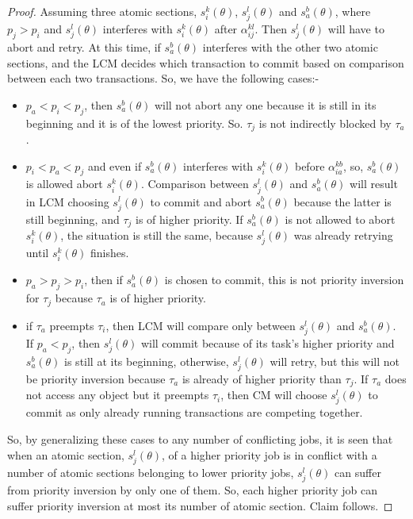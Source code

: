 \documentclass[12pt,english]{report}
\newtheorem{proof}{Proof}
\begin{document}
\begin{proof}\normalfont
Assuming three atomic sections, $s_i^k(\theta)$, $s_j^l(\theta)$ and $s_a^b(\theta)$, where $p_j > p_i$ and $s_j^l(\theta)$ interferes with $s_i^k(\theta)$ after $\alpha_{ij}^{kl}$. Then $s_j^l(\theta)$ will have to abort and retry. At this time, if $s_a^b(\theta)$ interferes with the other two atomic sections, and the LCM decides which transaction to commit based on comparison between each two transactions. So, we have the following cases:-
\begin{itemize}
\item $p_a < p_i < p_j$, then $s_a^b(\theta)$ will not abort any one because it is still in its beginning and it is of the lowest priority. So. $\tau_j$ is not indirectly blocked by $\tau_a$.
\item $p_i<p_a<p_j$ and even if $s_a^b(\theta)$ interferes with $s_i^k(\theta)$ before $\alpha_{ia}^{kb}$, so, $s_a^b(\theta)$ is allowed abort $s_i^k(\theta)$. Comparison between $s_j^l(\theta)$ and $s_a^b(\theta)$ will result in LCM choosing $s_j^l(\theta)$ to commit and abort $s_a^b(\theta)$ because the latter is still beginning, and $\tau_j$ is of higher priority. If $s_a^b(\theta)$ is not allowed to abort $s_i^k(\theta)$, the situation is still the same, because $s_j^l(\theta)$ was already retrying until $s_i^k(\theta)$ finishes.
\item $p_a>p_j>p_i$, then if $s_a^b(\theta)$ is chosen to commit, this is not priority inversion for $\tau_j$ because $\tau_a$ is of higher priority.
\item if $\tau_a$ preempts $\tau_i$, then LCM will compare only between $s_j^l(\theta)$ and $s_a^b(\theta)$. If $p_a<p_j$, then $s_j^l(\theta)$ will commit because of its task's higher priority and $s_a^b(\theta)$ is still at its beginning, otherwise, $s_j^l(\theta)$ will retry, but this will not be priority inversion because $\tau_a$ is already of higher priority than $\tau_j$. If $\tau_a$ does not access any object but it preempts $\tau_i$, then CM will choose $s_j^l(\theta)$ to commit as only already running transactions are competing together.
\end{itemize}
So, by generalizing these cases to any number of conflicting jobs, it is seen that when an atomic section, $s_j^l(\theta)$, of a higher priority job is in conflict with a number of atomic sections belonging to lower priority jobs, $s_j^l(\theta)$ can suffer from priority inversion by only one of them. So, each higher priority job can suffer priority inversion at most its number of atomic section. Claim follows.
\end{proof}
\end{document}

